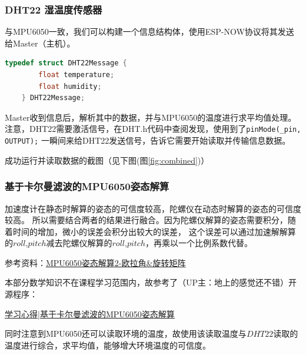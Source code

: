 \subsubsection{DHT22 湿温度传感器}

与MPU6050一致，我们可以构建一个信息结构体，使用ESP-NOW协议将其发送给Master（主机）。

\begin{lstlisting}[language=C++, title=DHT22 Message]
    typedef struct DHT22Message {
        float temperature;
        float humidity;
    } DHT22Message;
\end{lstlisting}

Master收到信息后，解析其中的数据，并与MPU6050的温度进行求平均值处理。
注意，DHT22需要激活信号，在DHT.h代码中查阅发现，使用到了\texttt{pinMode(\_pin, OUTPUT);} 一瞬间来给DHT22发送信号，告诉它需要开始读取并传输信息数据。

成功运行并读取数据的截图（见下图(图\ref{fig:combined})）

\subsubsection{基于卡尔曼滤波的MPU6050姿态解算}

加速度计在静态时解算的姿态的可信度较高，陀螺仪在动态时解算的姿态的可信度较高。
所以需要结合两者的结果进行融合。因为陀螺仪解算的姿态需要积分，随着时间的增加，微小的误差会积分出较大的误差，
这个误差可以通过加速解解算的$roll$,$pitch$减去陀螺仪解算的$roll$,$pitch$，再乘以一个比例系数代替。

参考资料：\href{https://zhuanlan.zhihu.com/p/195683958}{\underline{MPU6050姿态解算2-欧拉角\&旋转矩阵}}

本部分数学知识不在课程学习范围内，故参考了（UP主：地上的感觉还不错）开源程序：

\href{https://www.bilibili.com/video/BV1sL411F7fu}{\underline{学习心得|基于卡尔曼滤波的MPU6050姿态解算}}

同时注意到MPU6050还可以读取环境的温度，故使用该读取温度与$DHT22$读取的温度进行综合，求平均值，能够增大环境温度的可信度。

